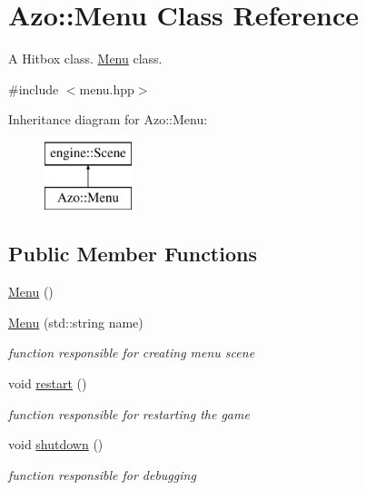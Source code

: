 \hypertarget{class_azo_1_1_menu}{}\section{Azo\+:\+:Menu Class Reference}
\label{class_azo_1_1_menu}


A Hitbox class. \hyperlink{class_azo_1_1_menu}{Menu} class.  




{\ttfamily \#include $<$menu.\+hpp$>$}

Inheritance diagram for Azo\+:\+:Menu\+:\begin{figure}[H]
\begin{center}
\leavevmode
\includegraphics[height=2.000000cm]{class_azo_1_1_menu}
\end{center}
\end{figure}
\subsection*{Public Member Functions}
\begin{DoxyCompactItemize}
\item 
\hyperlink{class_azo_1_1_menu_ab688f65761b8e8f37d855cbca00fae2e}{Menu} ()
\item 
\hyperlink{class_azo_1_1_menu_a5b8be0abc6a6c078e5deeab8e2ef5d47}{Menu} (std\+::string name)
\begin{DoxyCompactList}\small\item\em function responsible for creating menu scene \end{DoxyCompactList}\item 
void \hyperlink{class_azo_1_1_menu_a7f375c556043d9e1964c670fc6d0d846}{restart} ()
\begin{DoxyCompactList}\small\item\em function responsible for restarting the game \end{DoxyCompactList}\item 
void \hyperlink{class_azo_1_1_menu_a999a8b12f7d1e6572c65f1a97cb3163a}{shutdown} ()
\begin{DoxyCompactList}\small\item\em function responsible for debugging \end{DoxyCompactList}\end{DoxyCompactItemize}
